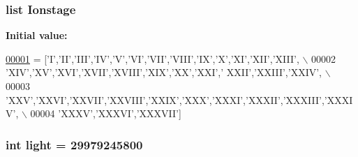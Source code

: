 \hypertarget{namespacepyneb_1_1utils_1_1__chianti__constants_a6ba3a6e6b5b9a7296dcff5cd8655c88b}{
\subsubsection[{Ionstage}]{\setlength{\rightskip}{0pt plus 5cm}list Ionstage}}\label{namespacepyneb_1_1utils_1_1__chianti__constants_a6ba3a6e6b5b9a7296dcff5cd8655c88b}
{\bfseries Initial value\-:}
\begin{DoxyCode}
\hypertarget{namespacepyneb_1_1utils_1_1__chianti__constants_l00001}{}\hyperlink{namespacepyneb_1_1utils_1_1__chianti__constants}{00001} = [\textcolor{stringliteral}{'I'},\textcolor{stringliteral}{'II'},\textcolor{stringliteral}{'III'},\textcolor{stringliteral}{'IV'},\textcolor{stringliteral}{'V'},\textcolor{stringliteral}{'VI'},\textcolor{stringliteral}{'VII'},\textcolor{stringliteral}{'VIII'},\textcolor{stringliteral}{'IX'},\textcolor{stringliteral}{'X'},\textcolor{stringliteral}{'XI'},\textcolor{stringliteral}{'XII'},\textcolor{stringliteral}{'XIII'}, \(\backslash\)
00002     \textcolor{stringliteral}{'XIV'},\textcolor{stringliteral}{'XV'},\textcolor{stringliteral}{'XVI'},\textcolor{stringliteral}{'XVII'},\textcolor{stringliteral}{'XVIII'},\textcolor{stringliteral}{'XIX'},\textcolor{stringliteral}{'XX'},\textcolor{stringliteral}{'XXI'},\textcolor{stringliteral}{' XXII'},\textcolor{stringliteral}{'XXIII'},\textcolor{stringliteral}{'XXIV'}, \(\backslash\)
00003     \textcolor{stringliteral}{'XXV'},\textcolor{stringliteral}{'XXVI'},\textcolor{stringliteral}{'XXVII'},\textcolor{stringliteral}{'XXVIII'},\textcolor{stringliteral}{'XXIX'},\textcolor{stringliteral}{'XXX'},\textcolor{stringliteral}{'XXXI'},\textcolor{stringliteral}{'XXXII'},\textcolor{stringliteral}{'XXXIII'},\textcolor{stringliteral}{'XXXIV'}, \(\backslash\)
00004     \textcolor{stringliteral}{'XXXV'},\textcolor{stringliteral}{'XXXVI'},\textcolor{stringliteral}{'XXXVII'}]
\end{DoxyCode}
\hypertarget{namespacepyneb_1_1utils_1_1__chianti__constants_a840d98f11adfbaeeb77afa32ceb0e278}{
\subsubsection[{light}]{\setlength{\rightskip}{0pt plus 5cm}int light = 29979245800}}\label{namespacepyneb_1_1utils_1_1__chianti__constants_a840d98f11adfbaeeb77afa32ceb0e278}
